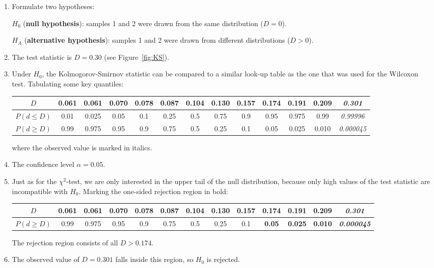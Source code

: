 \begin{enumerate}
\item  Formulate two hypotheses:

  $H_0$ (\textbf{null hypothesis}): samples 1 and 2 were drawn from
  the same distribution ($D = 0$).

  $H_{\!A}$ (\textbf{alternative hypothesis}): samples 1 and 2 were
  drawn from different distributions ($D > 0$).
  
\item The test statistic is $D=0.30$ (see Figure~\ref{fig:KS}).

\item Under $H_0$, the Kolmogorov-Smirnov statistic can be compared to
  a similar look-up table as the one that was used for the Wilcoxon
  test. Tabulating some key quantiles:\medskip

  \begin{tabular}{c|c@{\gap}c@{\gap}c@{\gap}c@{\gap}
      c@{\gap}c@{\gap}c@{\gap}c@{\gap}c@{\gap}c@{\gap}c@{\gap}c}
    $D$ & 0.061 & 0.061 & 0.070 & 0.078 & 0.087 & 0.104 &
    0.130 & 0.157 & 0.174 & 0.191 & 0.209 & \textit{0.301}\\ \hline
    $P(d\leq{D})$ & 0.01 & 0.025 & 0.05 & 0.1 & 0.25 &
    0.5 & 0.75 & 0.9 & 0.95 & 0.975 & 0.99 & \textit{0.99996}\\
    $P(d\geq{D})$ & 0.99 & 0.975 & 0.95 & 0.9 & 0.75 & 0.5 &
    0.25 & 0.1 & 0.05 & 0.025 & 0.010 & \textit{0.000045}
  \end{tabular}\medskip

  \noindent where the observed value is marked in italics.
  
\item The confidence level $\alpha = 0.05$.

\item Just as for the $\chi^2$-test, we are only interested in the
  upper tail of the null distribution, because only high values of the
  test statistic are incompatible with $H_0$. Marking the one-sided
  rejection region in bold:\medskip

  \begin{tabular}{c|c@{\gap}c@{\gap}c@{\gap}c@{\gap}
      c@{\gap}c@{\gap}c@{\gap}c@{\gap}c@{\gap}c@{\gap}c@{\gap}c}
    $D$ & 0.061 & 0.061 & 0.070 & 0.078 & 0.087 & 0.104 &
    0.130 & 0.157 & \textbf{0.174} & \textbf{0.191} &
    \textbf{0.209} & \textbf{\textit{0.301}}\\ \hline
    $P(d\geq{D})$ & 0.99 & 0.975 & 0.95 & 0.9 & 0.75 & 0.5 &
    0.25 & 0.1 & \textbf{0.05} & \textbf{0.025} & \textbf{0.010} &
    \textbf{\textit{0.000045}}
  \end{tabular}\medskip

  The rejection region consists of all $D>{0.174}$.

\item The observed value of $D=0.301$ falls inside this region, so
  $H_0$ is rejected.

\end{enumerate}

